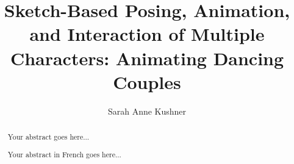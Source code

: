 \documentclass[12pt, a4paper]{memoir} %
\title{Sketch-Based Posing, Animation, and Interaction of Multiple Characters: Animating Dancing Couples} %
\author{Sarah Anne Kushner}
\date{\mydate} %
\begin{document}
\frontmatter
\begin{titlingpage}
\maketitle
\end{titlingpage}

\setlength{\parskip}{-1pt plus 1pt}

\renewcommand{\abstracttextfont}{\normalfont}
\abstractintoc
\begin{abstract} 
Your abstract goes here... 
\end{abstract}
\abstractintoc

\renewcommand\abstractname{R\'esum\'e}
\begin{abstract} 
Your abstract in French goes here... 
\end{abstract}

\newpage
\end{document}
